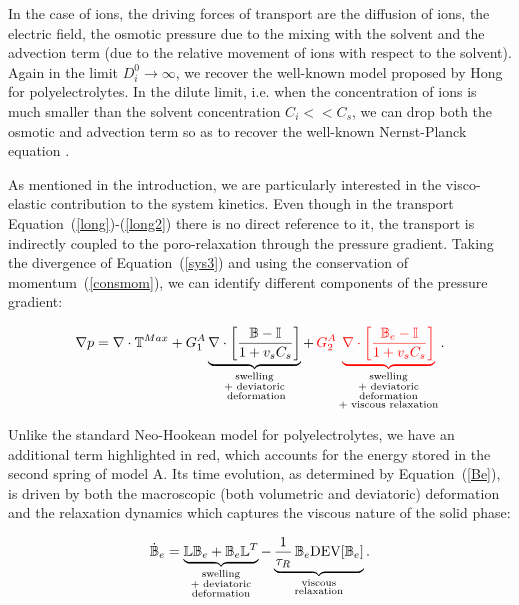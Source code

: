 In the case of ions, the driving forces of transport are the diffusion of ions, the electric field, the osmotic pressure due to the mixing with the solvent and the advection term (due to the relative movement of ions with respect to the solvent). Again in the limit $D^0_i\rightarrow\infty$, we recover the well-known model proposed by Hong \cite{Reviewpolyel} for polyelectrolytes. In the dilute limit, i.e. when the concentration of ions is much smaller than the solvent  concentration $C_i<<C_s$, we can drop both the osmotic and advection term so as to recover the well-known Nernst-Planck equation \cite[see Equation (6.67)]{Reviewpolyel}.

As mentioned in the introduction, we are particularly interested in the visco-elastic contribution to the system kinetics. Even though in the transport Equation~(\ref{long})-(\ref{long2}) there is no direct reference to it, the transport is indirectly coupled to the poro-relaxation through the pressure gradient. Taking the divergence of Equation~(\ref{sys3}) and using the conservation of momentum~(\ref{consmom}), we can identify different components of the pressure gradient:

\begin{equation}
\nabla p= \nabla \cdot \mathbb{T}^{Max} + G_1^A\underbrace{ \nabla \cdot \left[\frac{\mathbb{B}-\mathbb{I}}{1+v_sC_s}\right]}_{\substack{\text{swelling}\\\text{+ deviatoric}\\\text{ deformation}}} + \,\color{red} G_2^A \underbrace{\nabla \cdot\left[\frac{\mathbb{B}_e-\mathbb{I}}{1+v_sC_s}\right]}_{\color{black}\substack{\text{swelling}\\\text{+ deviatoric}\\\text{deformation}\\\text{+ viscous relaxation}}}\color{black}.
\end{equation}

Unlike the standard Neo-Hookean model for polyelectrolytes, we have an additional term highlighted in red, which accounts for the energy stored in the second spring of model A. Its time evolution, as determined by Equation~(\ref{Be}), is driven by both the macroscopic (both volumetric and deviatoric) deformation and the relaxation dynamics which captures the viscous nature of the solid phase:

\begin{equation}
\dot{\mathbb{B}}_e=\underbrace{\mathbb{L}\mathbb{B}_e + \mathbb{B}_e \mathbb{L}^T}_{\substack{\text{swelling}\\\text{+ deviatoric}\\\text{deformation}}} - \underbrace{\frac{1}{\tau_R} \,\mathbb{B}_e\text{DEV}[\mathbb{B}_e]}_{\substack{\text{viscous}\\\text{relaxation}}}.\label{Be2}
\end{equation}


